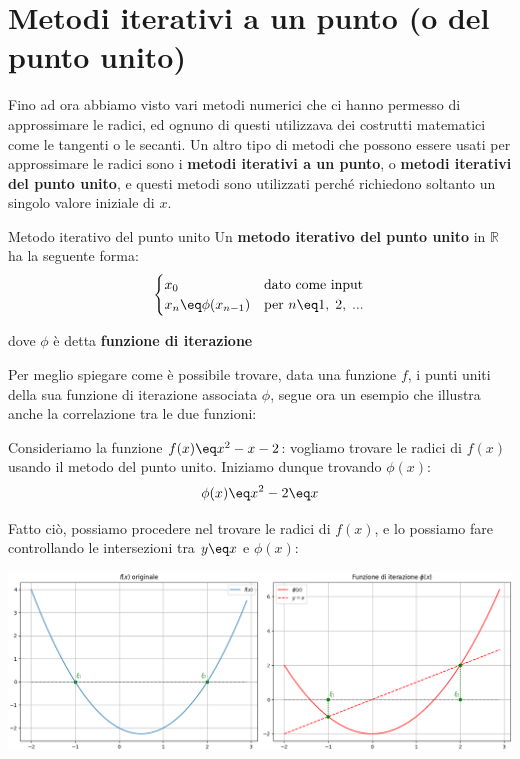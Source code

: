 \section{Metodi iterativi a un punto (o del punto unito)}

Fino ad ora abbiamo visto vari metodi numerici che ci hanno permesso di approssimare le radici, ed ognuno di questi utilizzava dei costrutti matematici come le tangenti o le secanti. Un altro tipo di metodi che possono essere usati per approssimare le radici sono i \textbf{metodi iterativi a un punto}, o \textbf{metodi iterativi del punto unito}, e questi metodi sono utilizzati perché richiedono soltanto un singolo valore iniziale di $x$.

\begin{definition}{Metodo iterativo del punto unito}
    Un \textbf{metodo iterativo del punto unito} in $\mathbb{R}$ ha la seguente forma:
    \[ \begin{cases}
        x_0 & \text{dato come input} \\
        x_n \eq \phi(x_{n - 1}) & \text{per } n\eq 1, \; 2, \; ...
    \end{cases} \]

    dove $\phi$ è detta \textbf{funzione di iterazione}
\end{definition}

Per meglio spiegare come è possibile trovare, data una funzione $f$, i punti uniti della sua funzione di iterazione associata $\phi$, segue ora un esempio che illustra anche la correlazione tra le due funzioni:

\begin{example}
    Consideriamo la funzione $f(x) \eq x^2 - x - 2$: vogliamo trovare le radici di $f(x)$ usando il metodo del punto unito. Iniziamo dunque trovando $\phi(x)$:
    \[ \phi(x) \eq x^2 - 2 \eq x \]

    Fatto ciò, possiamo procedere nel trovare le radici di $f(x)$, e lo possiamo fare controllando le intersezioni tra $y \eq x$ e $\phi(x)$:
    
    \begin{center}
        \includegraphics[width=\linewidth]{assets/image-006.png}
    \end{center}
\end{example}

